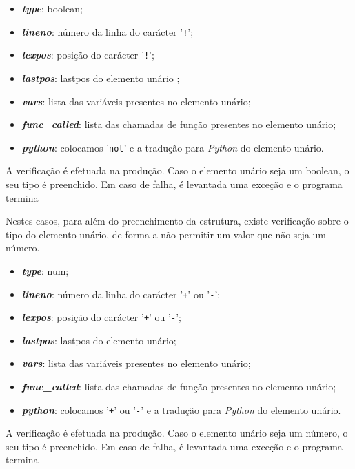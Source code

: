 \documentclass[11pt,a4paper]{report}
\makeatletter
\newcommand\subsubsubsection{\@startsection{paragraph}{4}{\z@}{-2.5ex\@plus -1ex \@minus -.25ex}{1.25ex \@plus .25ex}{\normalfont\normalsize\bfseries}}
\makeatother
\begin{document}
\begin{itemize}
  \item \textit{\textbf{type}}: boolean;
  \item \textit{\textbf{lineno}}: número da linha do carácter '\texttt{!}';
  \item \textit{\textbf{lexpos}}: posição do carácter '\texttt{!}';
  \item \textit{\textbf{lastpos}}: lastpos do elemento unário ;
  \item \textit{\textbf{vars}}: lista das variáveis presentes no elemento unário;
  \item \textit{\textbf{func\_called}}: lista das chamadas de função presentes no elemento unário;
  \item \textit{\textbf{python}}: colocamos '\texttt{not}' e a tradução para \textit{Python} do elemento unário.
\end{itemize}

A verificação é efetuada na produção. Caso o elemento unário seja um boolean, o seu tipo é preenchido. Em caso de falha, é levantada uma exceção e o programa termina

\subsubsubsection{Menos e mais}
Nestes casos, para além do preenchimento da estrutura, existe verificação sobre o tipo do elemento unário, de forma a não permitir um valor que não seja um número.

\begin{itemize}
  \item \textit{\textbf{type}}: num;
  \item \textit{\textbf{lineno}}: número da linha do carácter '\texttt{+}' ou '\texttt{-}';
  \item \textit{\textbf{lexpos}}: posição do carácter '\texttt{+}' ou '\texttt{-}';
  \item \textit{\textbf{lastpos}}: lastpos do elemento unário;
  \item \textit{\textbf{vars}}: lista das variáveis presentes no elemento unário;
  \item \textit{\textbf{func\_called}}: lista das chamadas de função presentes no elemento unário;
  \item \textit{\textbf{python}}: colocamos '\texttt{+}' ou '\texttt{-}' e a tradução para \textit{Python} do elemento unário.
\end{itemize}

A verificação é efetuada na produção. Caso o elemento unário seja um número, o seu tipo é preenchido. Em caso de falha, é levantada uma exceção e o programa termina
\end{document}
